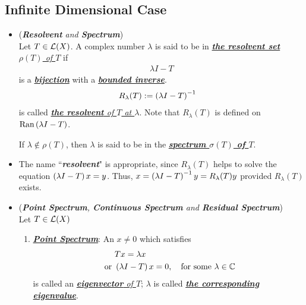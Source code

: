 \documentclass[11pt]{article}
\begin{document}
\subsection{Infinite Dimensional Case}
\begin{itemize}
\item \begin{definition} (\emph{\textbf{Resolvent} and \textbf{Spectrum}})\\
Let $T \in {\mathcal L}(X)$. A complex number $\lambda$ is said to be in \underline{\emph{\textbf{the resolvent set} $\rho(T)$ of $T$}} if  
\begin{align*}
\lambda I - T
\end{align*} is a \underline{\emph{\textbf{bijection}}} with a \underline{\emph{\textbf{bounded inverse}}}. 
\begin{align*}
R_{\lambda}(T) &:= \left(\lambda I - T\right)^{-1}
\end{align*} is called \underline{\emph{\textbf{the resolvent} of  $T$ at $\lambda$}}. Note that $R_{\lambda}(T)$ is defined on $\text{Ran}\left(\lambda I - T\right)$.

If $\lambda \not\in \rho(T)$, then $\lambda$ is said  to be in the \underline{\emph{\textbf{spectrum $\sigma(T)$ of $T$}}}. 
\end{definition}

\item \begin{remark}
The name ``\emph{\textbf{resolvent}}" is appropriate, since $R_{\lambda}(T)$ helps to solve
the equation $\left(\lambda I - T\right)x = y$. Thus, $x = \left(\lambda I - T\right)^{-1}y =R_{\lambda}(T)y$ provided $R_{\lambda}(T)$ exists.
\end{remark}

\item \begin{definition} (\emph{\textbf{Point Spectrum}, \textbf{Continuous Spectrum} and \textbf{Residual Spectrum}})\\
Let  $T \in {\mathcal L}(X)$
\begin{enumerate}
\item  \underline{\emph{\textbf{Point Spectrum}}}: An $x \neq 0$ which satisfies 
\begin{align*}
&Tx = \lambda x\\
\text{ or } &\left(\lambda I - T\right)x = 0, \quad \text{for some $\lambda \in {\mathbb C}$}
\end{align*} is called an \underline{\emph{\textbf{eigenvector} of $T$}}; $\lambda$ is called \underline{\emph{\textbf{the corresponding eigenvalue}}}. 


\end{enumerate}
\end{definition}
\end{itemize}
\end{document}
